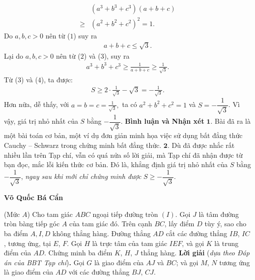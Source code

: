 \begin{multicols}{2}
\begin{align*}
		&\left( {{a^3} + {b^3} + {c^3}} \right)\left( {a + b + c} \right) \\
		\ge &{\left( {{a^2} + {b^2} + {c^2}} \right)^2} = 1. \tag{$2$}
	\end{align*}
	Do $a, b, c > 0$ nên từ ($1$) suy ra
	\begin{align*}
		a + b + c \le \sqrt 3 . \tag{$3$}
	\end{align*}
	Lại do $a, b, c > 0$ nên từ ($2$) và ($3$), suy ra
	\begin{align*}
		{a^3} + {b^3} + {c^3} \ge \frac{1}{{a + b + c}} \ge \frac{1}{{\sqrt 3 }}. \tag{$4$}
	\end{align*}
	Từ ($3$) và ($4$), ta được:
	\begin{align*}
		S \ge 2 \cdot \frac{1}{{\sqrt 3 }} - \sqrt 3  =  - \frac{1}{{\sqrt 3 }}.
	\end{align*}
	Hơn nữa, dễ thấy, với $a = b = c = \frac{1}{{\sqrt 3 }},$  ta có $a^2 + b^2 + c^2 = 1$  và $S = - \dfrac{1}{\sqrt{3}}$.
	\vskip 0.05cm 
	Vì vậy, giá trị nhỏ nhất của $S$ bằng  $- \dfrac{1}{\sqrt{3}}$.
	\vskip 0.05cm 
	\textbf{\color{thachthuctoanhoc}Bình luận và Nhận xét}
	\vskip 0.05cm
	$\pmb{1.}$ Bài đã ra là một bài toán cơ bản, một ví dụ đơn giản minh họa việc sử dụng bất đẳng thức Cauchy -- Schwarz trong chứng minh bất đẳng thức.
	\vskip 0.05cm
	$\pmb{2.}$ Dù đã được nhắc rất nhiều lần trên Tạp chí, vẫn có quá nửa số lời giải, mà Tạp chí đã nhận được từ bạn đọc, mắc lỗi kiến thức cơ bản. Đó là, khẳng định giá trị nhỏ nhất của $S$ bằng  $-\dfrac{1}{\sqrt{3}}$, \textit{ngay sau khi mới chỉ chứng minh được} $S \ge - \dfrac{1}{\sqrt{3}}$.  
	\begin{flushright}
		\textbf{\color{thachthuctoanhoc}Võ Quốc Bá Cẩn}
	\end{flushright}
	{}
	(Mức $A$) Cho tam giác $ABC$ ngoại tiếp đường tròn $(I)$. Gọi $J$ là tâm đường tròn bàng tiếp góc $A$ của tam giác đó. Trên cạnh $BC$, lấy điểm $D$ tùy ý, sao cho ba điểm $A, I, D$ không thẳng hàng. Đường thẳng $AD$ cắt các đường thẳng $IB$, $IC$, tương ứng, tại $E$, $F$. Gọi $H$ là trực tâm của tam giác $IEF$, và gọi $K$ là trung điểm của $AD$. Chứng minh ba điểm $K$, $H$, $J$ thẳng hàng.
	\vskip 0.05cm
	\textbf{\color{thachthuctoanhoc}Lời giải} (\textit{dựa theo Đáp án của BBT Tạp chí})\textbf{\color{thachthuctoanhoc}.}
	\vskip 0.05cm
	Gọi $G$ là giao điểm của $AJ$ và $BC$; và gọi $M$, $N$ tương ứng là giao điểm của $AD$ với các đường thẳng $BJ$, $CJ$.
	\begin{figure}[H]
		\vspace*{-5pt}

\end{figure}
\end{multicols}
